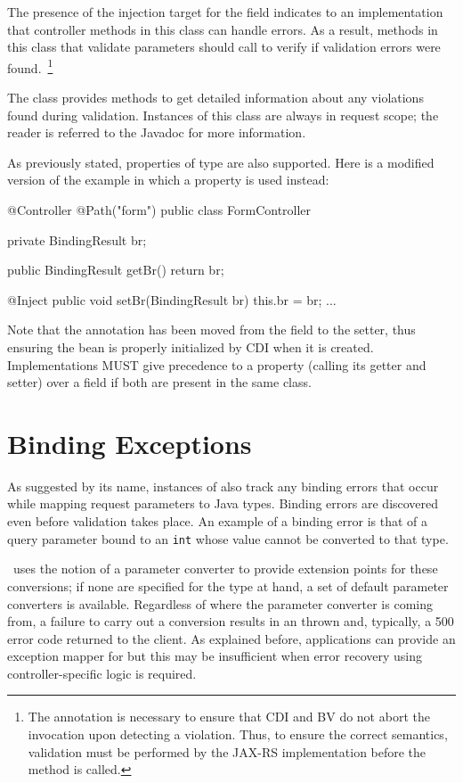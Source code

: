 The presence of the injection target for the field 
 indicates to an implementation that controller methods in this
class can handle errors. As a result, methods in this class
that validate parameters should call  to verify if
validation errors were found.~\footnote{The  
annotation is necessary to ensure that CDI and BV do not abort the
invocation upon detecting a violation. Thus, to ensure the correct semantics, 
validation must be performed by the JAX-RS implementation before the method 
is called.}

The class  provides methods to get detailed information 
about any violations 
found during validation. Instances of this class are always in request
scope; the reader is referred to the Javadoc for more information.

As previously stated, properties of type  
are also supported. Here is a modified version of the example in which
a property is used instead:

\begin{listing}{1}
@Controller
@Path("form")
public class FormController {

    private BindingResult br;
    
    public BindingResult getBr() {
        return br;
    }

    @Inject
    public void setBr(BindingResult br) {
        this.br = br;
    }
    ...
}
\end{listing}

Note that the  annotation has been moved from the field to the setter,
thus ensuring the bean is properly initialized by CDI when it is
created. Implementations MUST give precedence to a property (calling its getter and
setter) over a field if both are present in the same class.
 
\section{Binding Exceptions}
\label{binding_exceptions}

As suggested by its name, instances of  also track any 
binding errors that occur while mapping request parameters to Java
types. Binding errors are discovered even before validation takes place. An
example of a binding error is that of a query parameter bound to an {\tt int} whose
value cannot be converted to that type. 

 \jaxrs\ uses the notion of a parameter converter
to provide extension points for these conversions; if none are specified for
the type at hand, a set of default parameter converters is available. Regardless
of where the parameter converter is coming from, a failure to carry out a 
conversion results in an  thrown and, typically,
a 500 error code returned to the client. As explained before, applications can provide
an exception mapper for  but this may be
insufficient when error recovery using controller-specific logic is required. 

